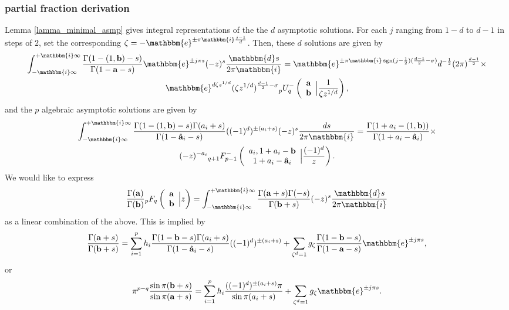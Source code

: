 \documentclass[12pt]{article}
\newcommand{\ee}[0] {\mathbbm{e}}
\newcommand{\ii}[0] {\mathbbm{i}}
\newcommand{\dd}[0] {\mathbbm{d}}
\numberwithin{equation}{section}
\newcommand{\FF}[6] {{}_{#1}{#2}_{#3} \left( \begin{array}{c} #4 \\ #5 \end{array} \Big| {#6}  \right)}
\newcommand{\FFe}[7] {{}_{#1}^{\,}{#2}_{#3}^{#4} \left( \begin{array}{c} #5 \\ #6 \end{array} \Big| {#7} \right)}
\newcommand{\bfa}[0] {\mathbf{a}}
\newcommand{\bfb}[0] {\mathbf{b}}
\begin{document}
\subsubsection{partial fraction derivation}
Lemma \ref{lamma_minimal_asmp} gives integral representations of the the $d$ asymptotic solutions. For each $j$ ranging from $1-d$ to $d-1$ in steps of $2$, set the corresponding $\zeta = -\ee^{\pm \pi \ii \frac{j-1}{d}}$. Then, these $d$ solutions are given by
\begin{gather*}
\int_{-\ii \infty}^{+\ii \infty} \frac{\Gamma(1-(1,\bfb)-s)}{\Gamma(1-\bfa-s)} \ee^{\pm j \pi s} (-z)^s \frac{\dd s}{2\pi \ii} = 
\ee^{\pm \pi \ii \operatorname{sgn}(j-\frac{1}{2}) (\frac{d-1}{2}-\sigma)} d^{-\frac{1}{2}} (2\pi)^{\frac{d-1}{2}} \times \\
\ee^{d \zeta z^{1/d}}(\zeta z^{1/d})^{\frac{d-1}{2}-\sigma} \FFe{p}{U}{q}{-}{\bfa}{\bfb}{\frac{1}{\zeta z^{1/d}}}\text{,}
\end{gather*}
and the $p$ algebraic asymptotic solutions are given by
\begin{gather*}
\int_{-\ii \infty}^{+\ii \infty} \frac{\Gamma(1-(1,\bfb)-s)\Gamma(a_i+s)}{\Gamma(1-\hat{\bfa}_i-s)} ((-1)^d)^{\pm (a_i+s)} (-z)^s \frac{ds}{2\pi \ii} =
\frac{\Gamma(1+a_i-(1,\bfb))}{\Gamma(1+a_i-\hat{\bfa}_i)} \times \\
(-z)^{-a_i} \FFe{q+1}{F}{p-1}{-}{a_i,1+a_i-\mathbf{b}}{1+a_i-\hat{\mathbf{a}}_i}{\frac{(-1)^d}{z}}\text{.}
\end{gather*}
We would like to express
\begin{equation*}
\frac{\Gamma(\mathbf{a})}{\Gamma(\mathbf{b})}\FF{p}{F}{q}{\mathbf{a}}{\mathbf{b}}{z} = \int_{-\ii \infty}^{+\ii \infty} \frac{\Gamma(\mathbf{a}+s) \Gamma(-s)}{\Gamma(\mathbf{b}+s)} (-z)^s \frac{\dd s}{2\pi \ii}
\end{equation*}
as a linear combination of the above. This is implied by
\begin{equation*}
\frac{\Gamma(\mathbf{a}+s)}{\Gamma(\mathbf{b}+s)} = \sum_{i=1}^{p} h_i \frac{\Gamma(1-\bfb-s)\Gamma(a_i+s)}{\Gamma(1-\hat{\bfa}_i-s)} ((-1)^d)^{\pm (a_i+s)} + \sum_{\zeta^d = 1} g_{\zeta} \frac{\Gamma(1-\bfb-s)}{\Gamma(1-\bfa-s)} \ee^{\pm j \pi s}\text{,}
\end{equation*}
or
\begin{equation*}
\pi^{p-q} \frac{\sin \pi(\bfb + s) } {\sin \pi(\bfa + s)}
 = \sum_{i=1}^{p} h_i \frac{((-1)^d)^{\pm (a_i+s)} \pi}{\sin \pi(a_i+s)} + \sum_{\zeta^d = 1} g_{\zeta} \ee^{\pm j \pi s}\text{.}
\end{equation*}
\end{document}
